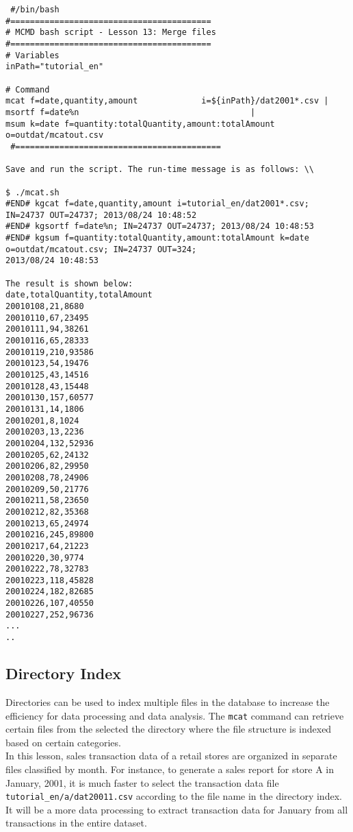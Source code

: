  \begin{verbatim}
 #/bin/bash
#=========================================
# MCMD bash script - Lesson 13: Merge files
#=========================================
# Variables
inPath="tutorial_en"

# Command 
mcat f=date,quantity,amount             i=${inPath}/dat2001*.csv | 
msortf f=date%n                                   |
msum k=date f=quantity:totalQuantity,amount:totalAmount o=outdat/mcatout.csv
 #==========================================
 
Save and run the script. The run-time message is as follows: \\

$ ./mcat.sh 
#END# kgcat f=date,quantity,amount i=tutorial_en/dat2001*.csv; IN=24737 OUT=24737; 2013/08/24 10:48:52
#END# kgsortf f=date%n; IN=24737 OUT=24737; 2013/08/24 10:48:53
#END# kgsum f=quantity:totalQuantity,amount:totalAmount k=date o=outdat/mcatout.csv; IN=24737 OUT=324; 
2013/08/24 10:48:53

The result is shown below: 
date,totalQuantity,totalAmount
20010108,21,8680
20010110,67,23495
20010111,94,38261
20010116,65,28333
20010119,210,93586
20010123,54,19476
20010125,43,14516
20010128,43,15448
20010130,157,60577
20010131,14,1806
20010201,8,1024
20010203,13,2236
20010204,132,52936
20010205,62,24132
20010206,82,29950
20010208,78,24906
20010209,50,21776
20010211,58,23650
20010212,82,35368
20010213,65,24974
20010216,245,89800
20010217,64,21223
20010220,30,9774
20010222,78,32783
20010223,118,45828
20010224,182,82685
20010226,107,40550
20010227,252,96736
...
..
\end{verbatim}


\subsection{Directory Index }

Directories can be used to index multiple files in the database to increase the efficiency for data processing and data analysis. The \verb|mcat| command can retrieve certain files from the selected the directory where the file structure is indexed based on certain categories. \\

In this lesson, sales transaction data of a retail stores are organized in separate files classified by month. For instance, to generate a sales report for store A in January, 2001, it is much faster to select the transaction data file \verb|tutorial_en/a/dat20011.csv| according to the file name in the directory index. It will be a more data processing to extract  transaction data for January from all transactions in the entire dataset.  \\

